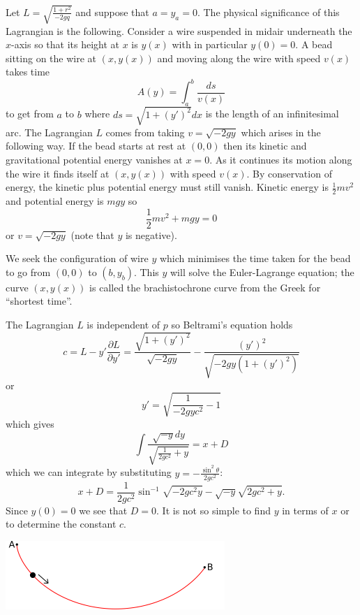 \begin{exm}[Brachistochrone]
Let $L=\sqrt{\frac{1+r^2}{-2gq}}$ and suppose that $a=y_a=0$. The physical significance of this Lagrangian is the following. Consider a wire suspended in midair underneath the $x$-axis so that its height at $x$ is $y(x)$ with in particular $y(0)=0$. A bead sitting on the wire at $(x,y(x))$ and moving along the wire with speed $v(x)$ takes time
\[A(y)=\int_a^b\frac{ds}{v(x)}\]
to get from $a$ to $b$ where $ds=\sqrt{1+(y')^2}dx$ is the length of an infinitesimal arc. The Lagrangian $L$ comes from taking $v=\sqrt{-2gy}$ which arises in the following way. If the bead starts at rest at $(0,0)$ then its kinetic and gravitational potential energy vanishes at $x=0$. As it continues its motion along the wire it finds itself at $(x,y(x))$ with speed $v(x)$. By conservation of energy, the kinetic plus potential energy must still vanish. Kinetic energy is $\frac{1}{2}mv^2$ and potential energy is $mgy$ so
\[\frac{1}{2}mv^2+mgy=0\]
or $v=\sqrt{-2gy}$ (note that $y$ is negative).

We seek the configuration of wire $y$ which minimises the time taken for the bead to go from $(0,0)$ to $(b,y_b)$. This $y$ will solve the Euler-Lagrange equation; the curve $(x,y(x))$ is called the brachistochrone curve from the Greek for ``shortest time''.

The Lagrangian $L$ is independent of $p$ so Beltrami's equation holds
\[c=L-y'\frac{\partial L}{\partial y'}=\frac{\sqrt{1+(y')^2}}{\sqrt{-2gy}}-\frac{(y')^2}{\sqrt{-2gy(1+(y')^2)}}\]
or
\[y'=\sqrt{\frac{1}{-2gyc^2}-1}\]
which gives
\[\int\frac{\sqrt{-y}dy}{\sqrt{\frac{1}{2gc^2}+y}}=x+D\]
which we can integrate by substituting $y=-\frac{\sin^2\theta}{2gc^2}$:
\[x+D=\frac{1}{2gc^2}\sin^{-1}\sqrt{-2gc^2y}-\sqrt{-y}\sqrt{2gc^2+y}.\]
Since $y(0)=0$ we see that $D=0$. It is not so simple to find $y$ in terms of $x$ or to determine the constant $c$.
\end{exm}

{
\begin{center}
\includegraphics{brachistochrone.png}
\end{center}
}



